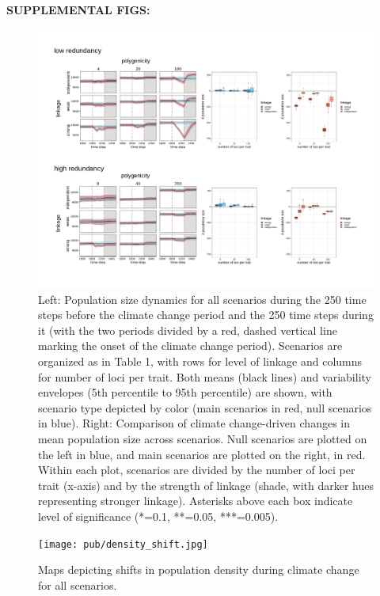 \documentclass[9pt,twocolumn,twoside,lineno]{pnas-new}
\begin{document}

\textbf{SUPPLEMENTAL FIGS:}


\begin{figure}[\sidecaptionrelwidth][t]
\centering
\includegraphics[width=17.8cm]{Nt_time_series_and_boxplots.jpg}
\caption{Left: Population size dynamics for all scenarios during the 250 time steps before the climate change period and the 250 time steps during it (with the two periods divided by a red, dashed vertical line marking the onset of the climate change period). Scenarios are organized as in Table 1, with rows for level of linkage and columns for number of loci per trait. Both means (black lines) and variability envelopes (5th percentile to 95th percentile) are shown, with scenario type depicted by color (main scenarios in red, null scenarios in blue). Right: Comparison of climate change-driven changes in mean population size across scenarios. Null scenarios are plotted on the left in blue, and main scenarios are plotted on the right, in red. Within each plot, scenarios are divided by the number of loci per trait (x-axis) and by the strength of linkage (shade, with darker hues representing stronger linkage). Asterisks above each box indicate level of significance (*=0.1, **=0.05, ***=0.005).}
\label{fig:S1}
\end{figure}


\begin{figure}
\centering
\texttt{[image: pub/density\_shift.jpg]}
\caption{Maps depicting shifts in population density during climate change for all scenarios.}
\label{fig:S2}
\end{figure}
\end{document}
